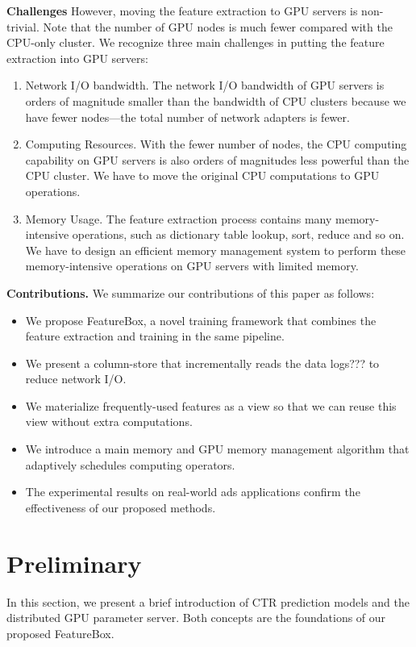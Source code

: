 \documentclass[conference]{IEEEtran}
\begin{document}
\textbf{Challenges}
However, moving the feature extraction to GPU servers is non-trivial. Note that the number of GPU nodes is much fewer compared with the CPU-only cluster. We recognize three main challenges in putting the feature extraction into GPU servers:
\begin{enumerate}
\item Network I/O bandwidth. The network I/O bandwidth of GPU servers is orders of magnitude smaller than the bandwidth of CPU clusters because we have fewer nodes---the total number of network adapters is fewer.   
\item Computing Resources. With the fewer number of nodes, the CPU computing capability on GPU servers is also orders of magnitudes less powerful than the CPU cluster. We have to move the original CPU computations to GPU operations.
\item Memory Usage. The feature extraction process contains many memory-intensive operations, such as dictionary table lookup, sort, reduce and so on. We have to design an efficient memory management system to perform these memory-intensive operations on GPU servers with limited memory.
\end{enumerate}

\textbf{Contributions.} 
We summarize our contributions of this paper as follows:
\begin{itemize}
\item We propose FeatureBox, a novel training framework that combines the feature extraction and training in the same pipeline. 
\item We present a column-store that incrementally reads the data logs??? to reduce network I/O.
\item We materialize frequently-used features as a view so that we can reuse this view without extra computations.
\item We introduce a main memory and GPU memory management algorithm that adaptively schedules computing operators.
\item The experimental results on real-world ads applications confirm the effectiveness of our proposed methods.
\end{itemize}

\section{Preliminary}
In this section, we present a brief introduction of CTR prediction models and the distributed GPU parameter server. Both concepts are the foundations of our proposed FeatureBox. 
\end{document}
